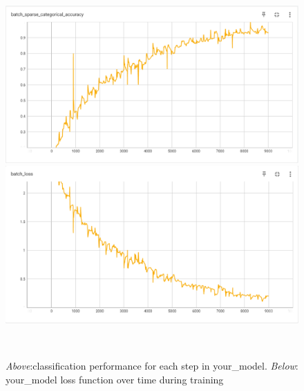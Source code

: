 \begin{figure}
    \centering
    \includegraphics[scale=0.35]{your_model_batch_acc.png}
    \includegraphics[scale=0.35]{your_model_batch_loss.png}
    \caption{\emph{Above}:classification performance for each step in your\_model. \emph{Below}: your\_model loss function over time during training}\
    \label{fig:your_model_batch_results}
\end{figure}

